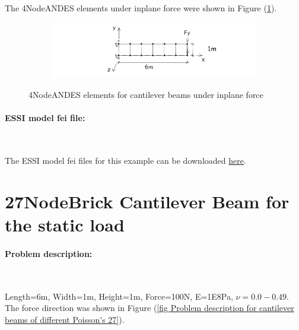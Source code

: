 \documentclass[fleqn,11pt]{article}
\begin{document}
The 4NodeANDES elements under inplane force were shown in Figure (\ref{fig 4NodeANDES elements for cantilever beams under inplane force}).

\begin{figure}[H]
  \centering
  \vskip 8pt
  \begin{subfigure}{0.5\textwidth}
    \centering
    \includegraphics[width=10cm]{../Figure-files/beam_ANDES_yz_inPlane_6div.pdf}
  \end{subfigure}
  \captionsetup{justification=centering,margin=3cm}
  \caption{4NodeANDES elements for cantilever beams under inplane force}
  \label{fig 4NodeANDES elements for cantilever beams under inplane force}
\end{figure}


\paragraph{ESSI model fei file: } ~




The ESSI model fei files for this example can be downloaded \href{https://github.com/BorisJeremic/Real-ESSI-Examples/blob/master/model_fei_file/ANDESshell_cantilever_inplane/ANDESshell_cantilever_inplane.tgz?raw=true}{here}.








\newpage
\section{27NodeBrick Cantilever Beam for the static load}

\paragraph{Problem description: } ~

Length=6m, Width=1m, Height=1m, Force=100N, E=1E8Pa, $\nu=0.0-0.49$.
The force direction was shown in Figure (\ref{fig Problem description for cantilever beams of different Poisson's 27}). 
\end{document}
